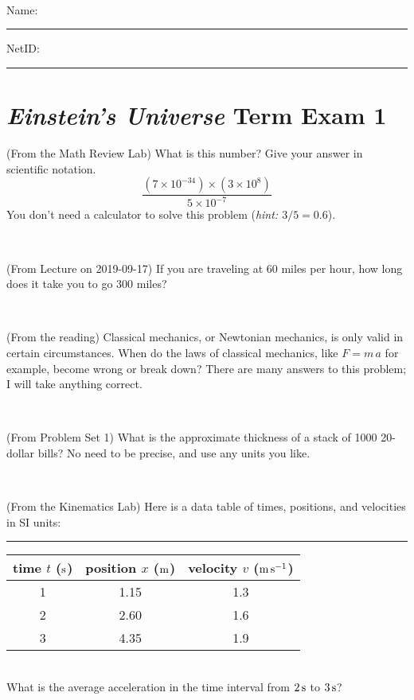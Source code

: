 \documentclass[12pt, letterpaper]{article}
\begin{document}
\vfill ~


\cleardoublepage



\noindent
Name: \rule[-1ex]{0.60\textwidth}{0.1pt}
NetID: \rule[-1ex]{0.20\textwidth}{0.1pt}

\section*{\textsl{Einstein's Universe} Term Exam 1}
\setcounter{problem}{1}


\begin{problem} (From the Math Review Lab)
What is this number? Give your answer in scientific notation.
$$
\frac{(7\times10^{-34})\times(3\times10^8)}{5\times10^{-7}}
$$
You don't need a calculator to solve this problem (\textit{hint: $3/5=0.6$}).
\end{problem}


\vfill ~

\begin{problem} (From Lecture on 2019-09-17)
If you are traveling at 60 miles per hour, how long does
it take you to go 300 miles?
\end{problem}


\vfill ~

\begin{problem} (From the reading)
Classical mechanics, or Newtonian mechanics, is only valid in certain
circumstances. When do the laws of classical mechanics, like $F =
m\,a$ for example, become wrong or break down? There are many answers
to this problem; I will take anything correct.
\end{problem}


\vfill ~

\begin{problem} (From Problem Set 1)
What is the approximate thickness of a stack of 1000 20-dollar bills?
No need to be precise, and use any units you like.
\end{problem}


\vfill ~


\clearpage


\begin{problem} (From the Kinematics Lab)
Here is a data table of times, positions, and velocities in SI units:\\
\rule{1.0in}{0pt}\begin{tabular}{c|c|c}
time $t$ ($\mathrm{s}$) & position $x$ ($\mathrm{m}$) & velocity $v$ ($\mathrm{m}\,\mathrm{s}^{-1}$) \\
\hline
1 & 1.15 & 1.3 \\
2 & 2.60 & 1.6 \\
3 & 4.35 & 1.9 \\
\hline
\end{tabular}\\
What is the average acceleration in the time interval from $2\,\mathrm{s}$ to $3\,\mathrm{s}$?
\end{problem}
\end{document}
